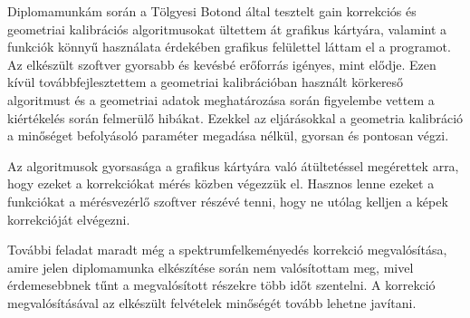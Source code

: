 \documentclass[a4paper,12pt]{article}
\begin{document}
Diplomamunkám során a Tölgyesi Botond által \cite{botond} tesztelt gain korrekciós és geometriai kalibrációs algoritmusokat ültettem át grafikus kártyára, valamint a funkciók könnyű használata érdekében grafikus felülettel láttam el a programot. Az elkészült szoftver gyorsabb és kevésbé erőforrás igényes, mint elődje. Ezen kívül továbbfejlesztettem a geometriai kalibrációban használt körkereső algoritmust és a geometriai adatok meghatározása során figyelembe vettem a kiértékelés során felmerülő hibákat. Ezekkel az eljárásokkal a geometria kalibráció a minőséget befolyásoló paraméter megadása nélkül, gyorsan és pontosan végzi. 


Az algoritmusok gyorsasága a grafikus kártyára való átültetéssel megérettek arra, hogy ezeket a korrekciókat mérés közben végezzük el. Hasznos lenne ezeket a funkciókat a mérésvezérlő szoftver részévé tenni, hogy ne utólag kelljen a képek korrekcióját elvégezni.

További feladat maradt még a spektrumfelkeményedés korrekció megvalósítása, amire jelen diplomamunka elkészítése során nem valósítottam meg, mivel érdemesebbnek tűnt a megvalósított részekre több időt szentelni. A korrekció megvalósításával az elkészült felvételek minőségét tovább lehetne javítani. 




%
%
%
\end{document}
